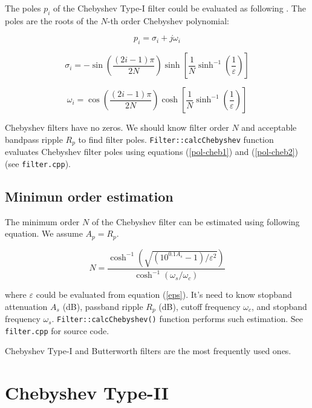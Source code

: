 The poles $p_i$ of the Chebyshev Type-I filter could be evaluated as following 
\cite{Hamming}. The poles are the roots of the $N$-th order Chebyshev 
polynomial:

\begin{equation}
 p_i = \sigma_i + j\omega_i
\end{equation}

\begin{equation}
 \sigma_i = -\sin\left(\frac{(2i-1)\pi}{2N}\right)           
\sinh\left[\frac{1}{N}\sinh^{-1}\left(\frac{1}{\varepsilon}\right)\right]
\label{pol-cheb1}
\end{equation}

\begin{equation}
 \omega_i = \cos\left(\frac{(2i-1)\pi}{2N}\right)           
\cosh\left[\frac{1}{N}\sinh^{-1}\left(\frac{1}{\varepsilon}\right)\right]
\label{pol-cheb2}
\end{equation}

Chebyshev filters have no zeros. We should know filter order $N$ and acceptable
bandpass ripple $R_p$ to find filter poles. \verb|Filter::calcChebyshev|
function evaluates Chebyshev filter poles using equations (\ref{pol-cheb1}) and
(\ref{pol-cheb2}) (see \verb|filter.cpp|).

\subsection{Minimun order estimation}

The minimum order $N$ of the Chebyshev filter can be estimated using following
equation. We assume $A_p=R_p$.

\begin{equation}
 N = \frac{\cosh^{-1}(\sqrt{(10^{0.1A_s}-1)/\varepsilon^2})} 
          {\cosh^{-1}(\omega_s/\omega_c)} \label{cheby1-order}
\end{equation}

where $\varepsilon$ could be evaluated from equation (\ref{eps}). It's need to
know stopband attenuation $A_s$ (dB), passband ripple $R_p$ (dB), cutoff
frequency $\omega_c$, and stopband frequency $\omega_s$.
\verb|Filter::calcChebyshev()| function performs such estimation. See
\verb|filter.cpp| for source code.

Chebyshev Type-I and Butterworth filters are the most frequently used ones.

\section{Chebyshev Type-II}

